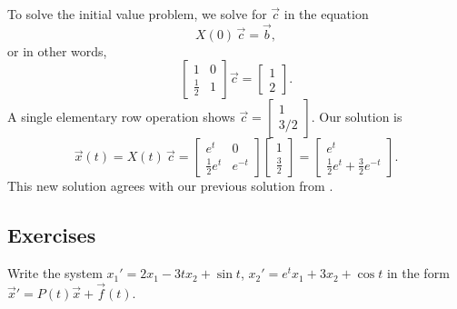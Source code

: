\begin{example}
To solve the initial value problem, we solve for $\vec{c}$ in the equation
\begin{equation*}
X(0)\,\vec{c} = \vec{b} ,
\end{equation*}
or in other words,
\begin{equation*}
\begin{bmatrix}
1 & 0 \\
\frac{1}{2} & 1
\end{bmatrix} 
\vec{c} = 
\begin{bmatrix}
1 \\ 2
\end{bmatrix} .
\end{equation*}
A single elementary row operation shows
$\vec{c} =
\left[ \begin{smallmatrix} 1 \\ 3/2 \end{smallmatrix} \right]$.
Our solution is
\begin{equation*}
\vec{x}(t) = 
X(t)\,\vec{c} = 
\begin{bmatrix}
e^t & 0 \\
\frac{1}{2} e^t & e^{-t}
\end{bmatrix}
\begin{bmatrix}
1 \\ \frac{3}{2}
\end{bmatrix} =
\begin{bmatrix}
e^t \\
\frac{1}{2} e^t + \frac{3}{2} e^{-t}
\end{bmatrix} .
\end{equation*}
This new solution agrees with our previous solution from .
\end{example}

\subsection{Exercises}

\begin{exercise}
Write the system $x_1' = 2 x_1 - 3t x_2 + \sin t$,
$x_2' = e^t x_1 + 3 x_2 + \cos t$ in the form
${\vec{x}}' = P(t) \vec{x} + \vec{f}(t)$.
\end{exercise}

